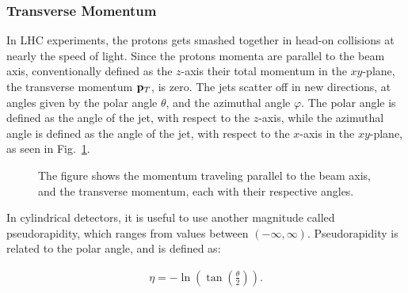 \documentclass[12pt,a4paper]{article}
\numberwithin{equation}{section}
\begin{document}
\subsubsection{Transverse Momentum}\label{sec:transmomentum}
In LHC experiments, the protons gets smashed together in head-on collisions at
nearly the speed of light. Since the protons momenta are parallel to the beam
axis, conventionally defined as the $z$-axis their total momentum in the
$xy$-plane, the transverse momentum $\vb p_T$, is zero. The jets scatter off in
new directions, at angles given by the polar angle $\theta$, and the azimuthal angle
$\varphi$. The polar angle is defined as the angle of the jet, with respect to the
$z$-axis, while the azimuthal angle is defined as the angle of the jet, with
respect to the $x$-axis in the $xy$-plane, as seen in Fig.~\ref{fig:momentum}.

\begin{figure}[H]
  \centering
  \caption{The figure shows the momentum traveling parallel to the beam axis, and
  the transverse momentum, each with their respective angles.\label{fig:momentum}}
\end{figure}

In cylindrical detectors, it is useful to use another magnitude called
pseudorapidity, which ranges from values between $(-\infty, \infty)$. Pseudorapidity is
related to the polar angle, and is defined as:

\begin{align}
\label{eq:pseudorapidity}
\eta = -\ln({\tan\left(\frac{\theta}{2}\right)}).
\end{align}
\end{document}
